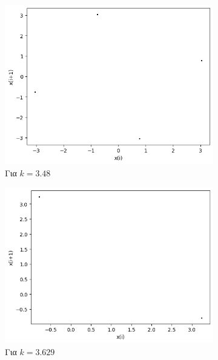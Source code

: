 \begin{figure}[ht]
\begin{subfigure}[b]{0.4\textwidth}
		\includegraphics[width=\textwidth]{LateX images/sine q=-0.3/g10}
		\caption{Για $k=3.48$}
		\label{f:k123}
	\end{subfigure}
	\hfill
	\begin{subfigure}[b]{0.4\textwidth}
		\centering
		\includegraphics[width=\textwidth]{LateX images/sine q=-0.3/g11}
		\caption{Για $k=3.629$}
		\label{f:k124}
	\end{subfigure}
	\hfill
	\begin{subfigure}[b]{0.4\textwidth}
		\centering

\end{subfigure}
\end{figure}
